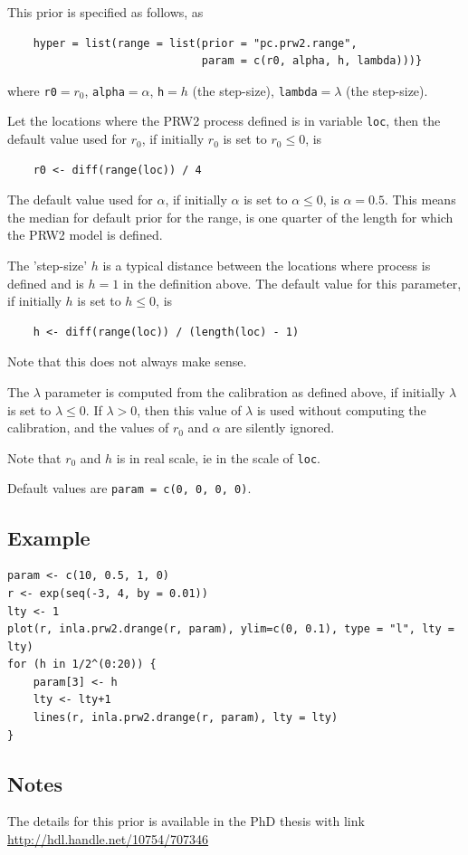 \documentclass[a4paper,11pt]{article}
\begin{document}
This prior is specified as follows, as
\begin{verbatim}
    hyper = list(range = list(prior = "pc.prw2.range",
                              param = c(r0, alpha, h, lambda)))}
\end{verbatim}
where \texttt{r0}$=r_0$, \texttt{alpha}$=\alpha$, \texttt{h}$=h$ (the
step-size), \texttt{lambda}$=\lambda$ (the step-size).

Let the locations where the PRW2 process defined is in variable
\texttt{loc}, then the default value used for $r_0$, if initially
$r_0$ is set to $r_0 \le 0$, is
\begin{verbatim}
    r0 <- diff(range(loc)) / 4
\end{verbatim}
The default value used for $\alpha$, if initially $\alpha$ is set to
$\alpha \le 0$, is $\alpha = 0.5$. This means the median for default
prior for the range, is one quarter of the length for which the PRW2
model is defined.

The 'step-size' $h$ is a typical distance between the locations where
process is defined and is $h=1$ in the definition above. 
The default value for this parameter, if initially $h$ is set to $h\le 0$,
is
\begin{verbatim}
    h <- diff(range(loc)) / (length(loc) - 1)
\end{verbatim}
Note that this does not always make sense.

The $\lambda$ parameter is computed from the calibration as defined
above, if initially $\lambda$ is set to $\lambda \le 0$. If
$\lambda > 0$, then this value of $\lambda$ is used without computing
the calibration, and the values of $r_0$ and $\alpha$ are silently
ignored.

Note that $r_0$ and $h$ is in real scale, ie in the scale of
\texttt{loc}.

Default values are \texttt{param = c(0, 0, 0, 0)}.

\subsection*{Example}

\begin{verbatim}
param <- c(10, 0.5, 1, 0)
r <- exp(seq(-3, 4, by = 0.01))
lty <- 1
plot(r, inla.prw2.drange(r, param), ylim=c(0, 0.1), type = "l", lty = lty)
for (h in 1/2^(0:20)) {
    param[3] <- h
    lty <- lty+1
    lines(r, inla.prw2.drange(r, param), lty = lty)
}
\end{verbatim}

\subsection*{Notes}

The details for this prior is available in the PhD thesis with link
\url{http://hdl.handle.net/10754/707346}
\end{document}
